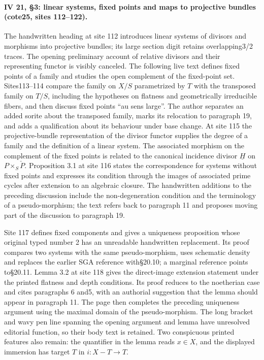 \paragraph{IV 21, \S3: linear systems, fixed points and maps to projective bundles (cote25, sites 112--122).}
The handwritten heading at site 112 introduces linear systems of divisors and morphisms into projective bundles; its large section digit retains overlapping3/2 traces. The opening preliminary account of relative divisors and their representing functor is visibly canceled. The following live text defines fixed points of a family and studies the open complement of the fixed-point set. Sites113--114 compare the family on $X/S$ parametrized by $T$ with the transposed family on $T/S$, including the hypotheses on flatness and geometrically irreducible fibers, and then discuss fixed points ``au sens large''. The author separates an added sorite about the transposed family, marks its relocation to paragraph 19, and adds a qualification about its behaviour under base change. At site 115 the projective-bundle representation of the divisor functor supplies the degree of a family and the definition of a linear system. The associated morphism on the complement of the fixed points is related to the canonical incidence divisor $\underline H$ on $P\times_S\check P$. Proposition 3.1 at site 116 states the correspondence for systems without fixed points and expresses its condition through the images of associated prime cycles after extension to an algebraic closure. The handwritten additions to the preceding discussion include the non-degeneration condition and the terminology of a pseudo-morphism; the text refers back to paragraph 11 and proposes moving part of the discussion to paragraph 19.

Site 117 defines fixed components and gives a uniqueness proposition whose original typed number 2 has an unreadable handwritten replacement. Its proof compares two systems with the same pseudo-morphism, uses schematic density and replaces the earlier SGA reference with\S20.10; a marginal reference points to\S20.11. Lemma 3.2 at site 118 gives the direct-image extension statement under the printed flatness and depth conditions. Its proof reduces to the noetherian case and cites paragraphs 6 and5, with an authorial suggestion that the lemma should appear in paragraph 11. The page then completes the preceding uniqueness argument using the maximal domain of the pseudo-morphism. The long bracket and wavy pen line spanning the opening argument and lemma have unresolved editorial function, so their body text is retained. Two conspicuous printed features also remain: the quantifier in the lemma reads $x\in X$, and the displayed immersion has target $T$ in $i:X-T\to T$.

